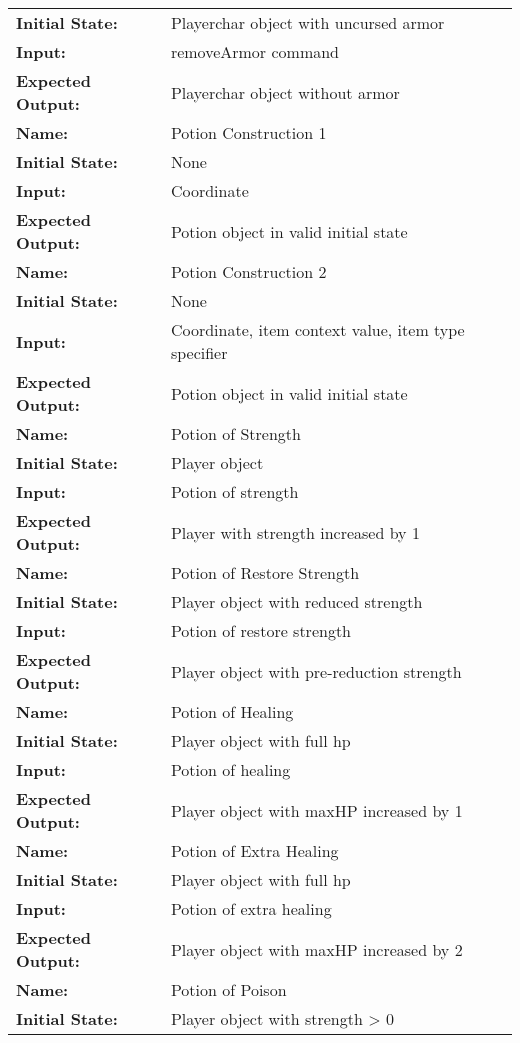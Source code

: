 \documentclass[12pt, titlepage]{article}
\begin{document}
\begin{center}
\begin{longtable}{ l | l }
\textbf{Initial State:} & Playerchar object with uncursed armor\\
\textbf{Input:} & removeArmor command\\
\textbf{Expected Output:} & Playerchar object without armor\\
\hline
\textbf{Name:} & Potion Construction 1\\
\textbf{Initial State:} & None\\
\textbf{Input:} & Coordinate\\
\textbf{Expected Output:} & Potion object in valid initial state\\
\hline
\textbf{Name:} & Potion Construction 2\\
\textbf{Initial State:} & None\\
\textbf{Input:} & Coordinate, item context value, item type specifier\\
\textbf{Expected Output:} & Potion object in valid initial state\\
\hline
\textbf{Name:} & Potion of Strength\\
\textbf{Initial State:} & Player object\\
\textbf{Input:} & Potion of strength\\
\textbf{Expected Output:} & Player with strength increased by 1\\
\hline
\textbf{Name:} & Potion of Restore Strength\\
\textbf{Initial State:} & Player object with reduced strength\\
\textbf{Input:} & Potion of restore strength\\
\textbf{Expected Output:} & Player object with pre-reduction strength\\
\hline
\textbf{Name:} & Potion of Healing\\
\textbf{Initial State:} & Player object with full hp\\
\textbf{Input:} & Potion of healing\\
\textbf{Expected Output:} & Player object with maxHP increased by 1\\
\hline
\textbf{Name:} & Potion of Extra Healing\\
\textbf{Initial State:} & Player object with full hp\\
\textbf{Input:} & Potion of extra healing\\
\textbf{Expected Output:} & Player object with maxHP increased by 2\\
\hline
\textbf{Name:} & Potion of Poison\\
\textbf{Initial State:} & Player object with strength > 0\\

\end{longtable}
\end{center}
\end{document}
